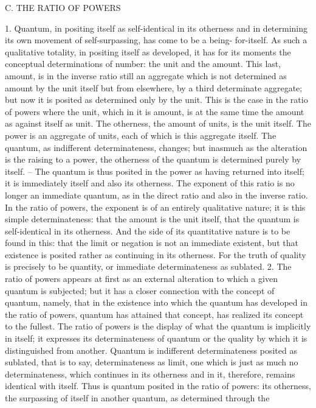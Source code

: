 C. THE RATIO OF POWERS

1. Quantum, in positing itself as self-identical in its otherness and in
determining its own movement of self-surpassing, has come to be a being-
for-itself. As such a qualitative totality, in positing itself as developed, it
has for its moments the conceptual determinations of number: the unit
and the amount. This last, amount, is in the inverse ratio still an aggregate
which is not determined as amount by the unit itself but from elsewhere,
by a third determinate aggregate; but now it is posited as determined only
by the unit. This is the case in the ratio of powers where the unit, which in
it is amount, is at the same time the amount as against itself as unit. The
otherness, the amount of units, is the unit itself. The power is an aggregate
of units, each of which is this aggregate itself. The quantum, as indifferent
determinateness, changes; but inasmuch as the alteration is the raising to a
power, the otherness of the quantum is determined purely by itself. – The
quantum is thus posited in the power as having returned into itself; it is
immediately itself and also its otherness.
The exponent of this ratio is no longer an immediate quantum, as in the
direct ratio and also in the inverse ratio. In the ratio of powers, the exponent
is of an entirely qualitative nature; it is this simple determinateness: that the
amount is the unit itself, that the quantum is self-identical in its otherness.
And the side of its quantitative nature is to be found in this: that the limit or
negation is not an immediate existent, but that existence is posited rather
as continuing in its otherness. For the truth of quality is precisely to be
quantity, or immediate determinateness as sublated.
2. The ratio of powers appears at first as an external alteration to which a
given quantum is subjected; but it has a closer connection with the concept
of quantum, namely, that in the existence into which the quantum has
developed in the ratio of powers, quantum has attained that concept, has
realized its concept to the fullest. The ratio of powers is the display of
what the quantum is implicitly in itself; it expresses its determinateness
of quantum or the quality by which it is distinguished from another.
Quantum is indifferent determinateness posited as sublated, that is to say,
determinateness as limit, one which is just as much no determinateness,
which continues in its otherness and in it, therefore, remains identical
with itself. Thus is quantum posited in the ratio of powers: its otherness,
the surpassing of itself in another quantum, as determined through the
